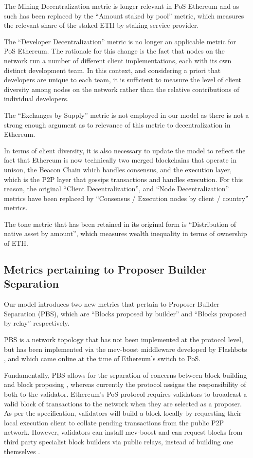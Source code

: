 \documentclass[conference]{IEEEtran}
\begin{document}
The Mining Decentralization metric is longer relevant in PoS Ethereum and as such has been replaced by the ``Amount staked by pool'' metric, which measures the relevant share of the staked ETH by staking service provider. 

The ``Developer Decentralization'' metric is no longer an applicable metric for PoS Ethereum. The rationale for this change is the fact that nodes on the network run a number of different client implementations, each with its own distinct development team.  In this context, and considering a priori that developers are unique to each team, it is sufficient to measure the level of client diversity among nodes on the network rather than the relative contributions of individual developers. 

The ``Exchanges by Supply'' metric is not employed in our model as there is not a strong enough argument as to relevance of this metric to decentralization in Ethereum.

In terms of client diversity, it is also necessary to update the model to reflect the fact that Ethereum is now technically two merged blockchains that operate in unison, the Beacon Chain which handles consensus, and the execution layer, which is the P2P layer that gossips transactions and handles execution.  For this reason, the original ``Client Decentralization'', and ``Node Decentralization'' metrics have been replaced by ``Consensus / Execution nodes by client / country'' metrics. 

The tone metric that has been retained in its original form is ``Distribution of native asset by amount'', which measures wealth inequality in terms of ownership of ETH.

\subsection{Metrics pertaining to Proposer Builder Separation}

Our model introduces two new metrics that pertain to Proposer Builder Separation (PBS), which are ``Blocks proposed by builder'' and ``Blocks proposed by relay'' respectively.

PBS is a network topology that has not been implemented at the protocol level, but has been implemented via the mev-boost middleware developed by Flashbots \cite{gosselin2021}, and which came online at the time of Ethereum's switch to PoS.

Fundamentally, PBS allows for the separation of concerns between block building and block proposing \cite{ethereum2023}, whereas currently the protocol assigns the responsibility of both to the validator.  Ethereum's PoS protocol requires validators to broadcast a valid block of transactions to the network when they are selected as a proposer.  As per the specification, validators will build a block locally by requesting their local execution client to collate pending transactions from the public P2P network. However, validators can install mev-boost and can request blocks from third party specialist block builders via public relays, instead of building one themselves \cite{ethereum2022}.
\end{document}
